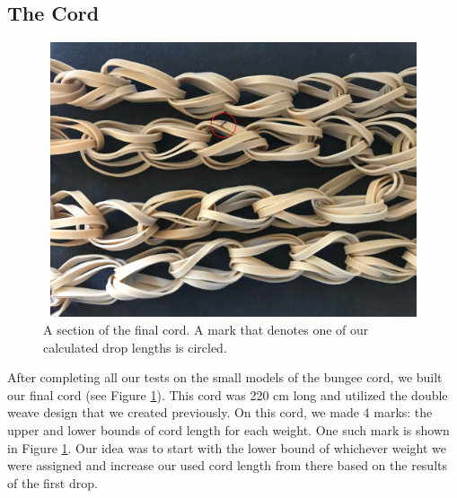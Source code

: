 \documentclass[12pt]{article}
\begin{document}
\subsection{The Cord}
\begin{figure}[h]
    \centering
    \includegraphics[width=14cm,height=8.1cm]{cordWeaveMark}
    \caption{A section of the final cord. A mark that denotes one of our calculated drop lengths is circled.}
    \label{fig:finalCord}
\end{figure}

After completing all our tests on the small models of the bungee cord, we built our final cord (see Figure \ref{fig:finalCord}). This cord was 220 cm long and utilized the double weave design that we created previously. On this cord, we made 4 marks: the upper and lower bounds of cord length for each weight. One such mark is shown in Figure \ref{fig:finalCord}. Our idea was to start with the lower bound of whichever weight we were assigned and increase our used cord length from there based on the results of the first drop.
\end{document}

